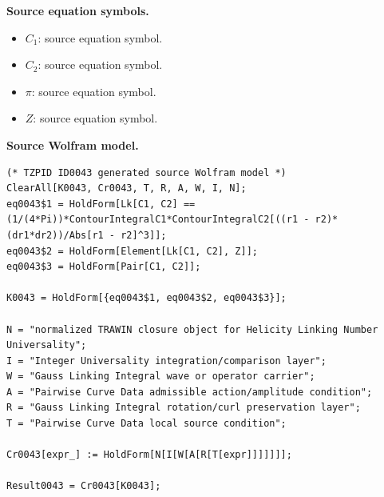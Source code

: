 \begin{minipage}[t]{0.49\linewidth}
\begingroup
\small
\raggedright
\textbf{Source equation symbols.}\par
\begin{itemize}[leftmargin=1.35em,itemsep=1pt,topsep=1pt,parsep=0pt]
    \item $C_{1}$: source equation symbol.
    \item $C_{2}$: source equation symbol.
    \item $\pi$: source equation symbol.
    \item $Z$: source equation symbol.
\end{itemize}
\endgroup
\end{minipage}\hfill
\begin{minipage}[t]{0.47\linewidth}
\begingroup
\scriptsize
\raggedright
\textbf{Source Wolfram model.}\par
\begin{Verbatim}[fontsize=\tiny,breaklines=true,breakanywhere=true]
(* TZPID ID0043 generated source Wolfram model *)
ClearAll[K0043, Cr0043, T, R, A, W, I, N];
eq0043$1 = HoldForm[Lk[C1, C2] == (1/(4*Pi))*ContourIntegralC1*ContourIntegralC2[((r1 - r2)*(dr1*dr2))/Abs[r1 - r2]^3]];
eq0043$2 = HoldForm[Element[Lk[C1, C2], Z]];
eq0043$3 = HoldForm[Pair[C1, C2]];

K0043 = HoldForm[{eq0043$1, eq0043$2, eq0043$3}];

N = "normalized TRAWIN closure object for Helicity Linking Number Universality";
I = "Integer Universality integration/comparison layer";
W = "Gauss Linking Integral wave or operator carrier";
A = "Pairwise Curve Data admissible action/amplitude condition";
R = "Gauss Linking Integral rotation/curl preservation layer";
T = "Pairwise Curve Data local source condition";

Cr0043[expr_] := HoldForm[N[I[W[A[R[T[expr]]]]]]];

Result0043 = Cr0043[K0043];
\end{Verbatim}
\endgroup
\end{minipage}

